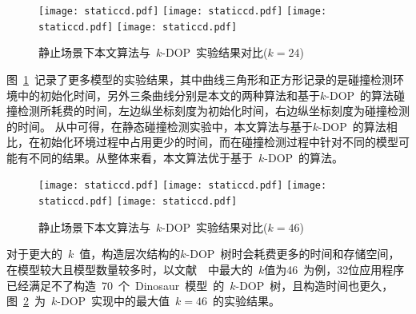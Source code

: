 \begin{figure}[htbp] 
\centering
{}
{  
   \texttt{[image: staticcd.pdf]}
}
{  
    \texttt{[image: staticcd.pdf]}
}\linebreak %
{  
   \texttt{[image: staticcd.pdf]}
}
{  
   \texttt{[image: staticcd.pdf]}
}
\caption{静止场景下本文算法与~$k$-DOP~实验结果对比($k=24$)}
\label{fig:chart:exps:kdop:kcbp:k24}
\end{figure}

图~\ref{fig:chart:exps:kdop:kcbp:k24}~记录了更多模型的实验结果，其中曲线三角形和正方形记录的是碰撞检测环境中的初始化时间，另外三条曲线分别是本文的两种算法和基于$k$-DOP~的算法碰撞检测所耗费的时间，左边纵坐标刻度为初始化时间，右边纵坐标刻度为碰撞检测的时间。
从中可得，在静态碰撞检测实验中，本文算法与基于$k$-DOP~的算法相比，在初始化环境过程中占用更少的时间，而在碰撞检测过程中针对不同的模型可能有不同的结果。从整体来看，本文算法优于基于~$k$-DOP~的算法。

\begin{figure}[htbp] 
\centering
{}
{  
   \texttt{[image: staticcd.pdf]}
}
{  
    \texttt{[image: staticcd.pdf]}
}\linebreak %
{  
   \texttt{[image: staticcd.pdf]}
}
{  
   \texttt{[image: staticcd.pdf]}
}
\caption{静止场景下本文算法与~$k$-DOP~实验结果对比($k=46$)}
\label{fig:chart:exps:kdop:kcbp:k46}
\end{figure}

对于更大的~$k$~值，构造层次结构的$k$-DOP~树时会耗费更多的时间和存储空间，在模型较大且模型数量较多时，以文献~~中最大的~$k$值为46~为例，32位应用程序已经满足不了构造~70~个~Dinosaur~模型~的~$k$-DOP~树，且构造时间也更久，图~\ref{fig:chart:exps:kdop:kcbp:k46}~为~$k$-DOP~实现中的最大值~$k=46$~的实验结果。

